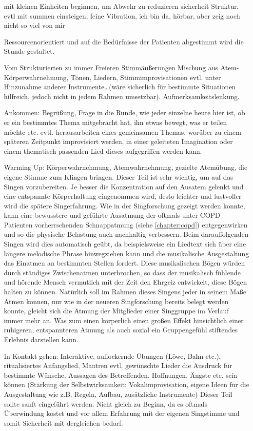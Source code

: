 mit kleinen Einheiten beginnen, um Abwehr zu reduzieren sicherheit Struktur. evtl mit summen einsteigen, feine Vibration, ich bin da, hörbar, aber zeig noch nicht so viel von mir

Ressourcenorientiert und auf die Bedürfnisse der Patienten abgestimmt wird die Stunde gestaltet.

Vom Strukturierten zu immer Freieren Stimmäußerungen
Mischung aus Atem- Körperwahrnehmung, Tönen, Liedern, Stimmimprovisationen evtl. unter Hinzunahme anderer Instrumente…(wäre sicherlich für bestimmte Situationen hilfreich, jedoch nicht in jedem Rahmen umsetzbar). 
Aufmerksamkeitslenkung. 

Ankommen: 
Begrüßung, Frage in die Runde, wie jeder einzelne heute hier ist, ob er ein bestimmtes Thema mitgebracht hat, ihn etwas bewegt, was er teilen möchte etc. evtl. herausarbeiten eines gemeinsamen Themas, worüber zu einem späteren Zeitpunkt improvisiert werden, in einer geleiteten Imagination oder einem thematisch passenden Lied dieses aufgegriffen werden kann.

Warming Up: 
Körperwahrnehmung, Atemwahrnehmung, gezielte Atemübung, die eigene Stimme zum Klingen bringen. Dieser Teil ist sehr wichtig, um auf das Singen vorzubereiten. Je besser die Konzentration auf den Ausatem gelenkt und eine entspannte Körperhaltung eingenommen wird, desto leichter und lustvoller wird die spätere Singerfahrung. Wie in der Singforschung gezeigt werden konnte, kann eine bewusstere und geführte Ausatmung der oftmals unter COPD-Patienten vorherrschenden Schnappatmung (siehe \ref{chapter:copd}) entgegenwirken und so die physische Belastung auch nachhaltig verbessern. Beim darauffolgenden Singen wird dies automatisch geübt, da beispielsweise ein Liedtext sich über eine längere melodische Phrase hinwegziehen kann und die musikalische Ausgestaltung das Einatmen an bestimmten Stellen fordert. Diese musikalischen Bögen würden durch ständiges Zwischenatmen unterbrochen, so dass der musikalisch fühlende und hörende Mensch vermutlich mit der Zeit den Ehrgeiz entwickelt, diese Bögen halten zu können. Natürlich soll im Rahmen dieses Singens jeder in seinem Maße Atmen können, nur wie in der neueren Singforschung bereits belegt werden konnte, gleicht sich die Atmung der Mitglieder einer Singgruppe im Verlauf immer mehr an. Was zum einen körperlich einen großen Effekt hinsichtlich einer ruhigeren, entspannteren Atmung als auch sozial ein Gruppengefühl stiftendes Erlebnis darstellen kann.

In Kontakt gehen: 
Interaktive, auflockernde Übungen (Löwe, Bahn etc.), ritualisiertes Anfangslied, Mantren evtl. gewünschte Lieder die Ausdruck für bestimmte Wünsche, Aussagen des Betreffenden, Hoffnungen, Ängste etc. sein können
(Stärkung der Selbstwirksamkeit: Vokalimprovisation, eigene Ideen für die Ausgestaltung wie z.B. Regeln, Aufbau, zusätzliche Instrumente) Dieser Teil sollte sanft eingeführt werden. Nicht gleich zu Beginn, da es oftmals Überwindung kostet und vor allem Erfahrung mit der eigenen Singstimme und somit Sicherheit mit dergleichen bedarf.

